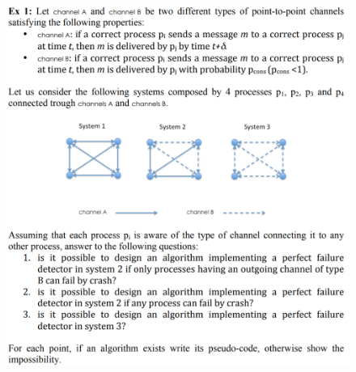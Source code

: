 \documentclass{article}
\begin{document}
\begin{figure}[H]
  \centering
  \includegraphics[scale=0.75, left]{cattura26.png}
\end{figure}
\end{document}

